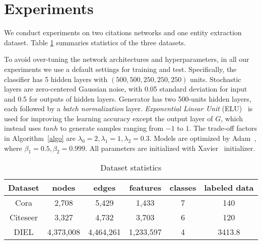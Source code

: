\section{Experiments}\label{sec:experiments}

We conduct experiments on two citations networks and one entity extraction dataset.
Table \ref{table:dataset} summaries statistics of the three datasets.


To avoid over-tuning the network architectures and hyperparameters, in all our experiments we use a default settings for training and test.
Specifically, the classifier has 5 hidden layers with $(500,500,250,250,250)$ units. Stochastic layers are zero-centered Gaussian noise, with 0.05 standard deviation for input and 0.5 for outputs of  hidden layers. Generator has two 500-units hidden layers, each followed by a {\it batch normalization} layer. {\it Exponential Linear Unit} (ELU)~\cite{clevert2015fast} is used for improving the learning accuracy 
except the output layer of $G$, which instead uses $tanh$ to generate samples ranging from $-1$ to $1$. The trade-off factors in Algorithm~\ref{algo} are $\lambda_0=2,\lambda_1=1,\lambda_2=0.3$. Models are optimized by Adam~\cite{kingma2014adam}, where $\beta_1=0.5,\beta_2=0.999$. All parameters are initialized with Xavier~\cite{glorot2010understanding} initializer. 

\begin{table}[b]
 \setlength{\tabcolsep}{4pt}
\caption{Dataset statistics}\label{table:dataset}
\centering
\begin{tabular}{cccccc}
\hline
Dataset&nodes&edges&features&classes&labeled data\\
\hline
Cora & 2,708 & 5,429 & 1,433 & 7 & 140 \\
Citeseer& 3,327 & 4,732 & 3,703 & 6 & 120 \\
DIEL & 4,373,008 & 4,464,261 & 1,233,597 & 4 & 3413.8 \\
\hline
\end{tabular}
\end{table}

